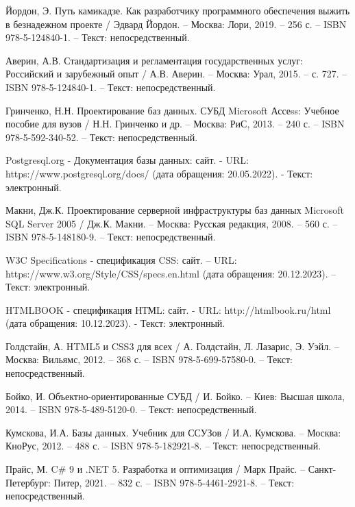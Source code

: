 \begin{thebibliography}{14}

     Йордон, Э. Путь камикадзе. Как разработчику программного обеспечения выжить в безнадежном проекте / Эдвард Йордон. – Москва: Лори, 2019. – 256 с. – ISBN 978-5-124840-1. – Текст: непосредственный.%

     Аверин, А.В. Стандартизация и регламентация государственных услуг: Российский и зарубежный опыт / А.В. Аверин. – Москва: Урал, 2015. – с. 727. – ISBN 978-5-124840-1. – Текст: непосредственный.%

     Гринченко, Н.Н. Проектирование баз данных. СУБД Microsoft Ассеss: Учебное пособие для вузов / Н.Н. Гринченко и др. – Москва: РиС, 2013. – 240 с. – ISBN 978-5-592-340-52. – Текст: непосредственный.%

     Postgresql.org -\- Документация базы данных: сайт. - URL: https://www.postgresql.org/docs/ (дата обращения: 20.05.2022). - Текст: электронный.

     Макни, Дж.К. Проектирование серверной инфраструктуры баз данных Microsoft SQL Server 2005 / Дж.К. Макни. – Москва: Русская редакция, 2008. – 560 с. – ISBN 978-5-148180-9. – Текст: непосредственный.%

     W3C Specifications -\- спецификация CSS: сайт. – URL: https://www.w3.org/Style/CSS/specs.en.html (дата обращения: 20.12.2023). – Текст: электронный.

     HTMLBOOK -\- спецификация НТМL: сайт. - URL: http://htmlbook.ru/html (дата обращения: 10.12.2023). - Текст: электронный.

 		Голдстайн, А. HTML5 и CSS3 для всех / А. Голдстайн, Л. Лазарис, Э. Уэйл. – Москва: Вильямс, 2012. – 368 с. – ISBN 978-5-699-57580-0. – Текст: непосредственный.

     Бойко, И. Объектно-ориентированные СУБД / И. Бойко. – Киев: Высшая школа, 2014. – ISBN 978-5-489-5120-0. – Текст: непосредственный.%

     Кумскова, И.А. Базы данных. Учебник для ССУЗов / И.А. Кумскова. – Москва: КноРус, 2012. – 488 с. – ISBN 978-5-182921-8. – Текст: непосредственный.%

     Прайс, М. C\# 9 и .NET 5. Разработка и оптимизация / Марк Прайс. – Санкт-Петербург: Питер, 2021. – 832 с. – ISBN 978-5-4461-2921-8. – Текст: непосредственный.


\end{thebibliography}

